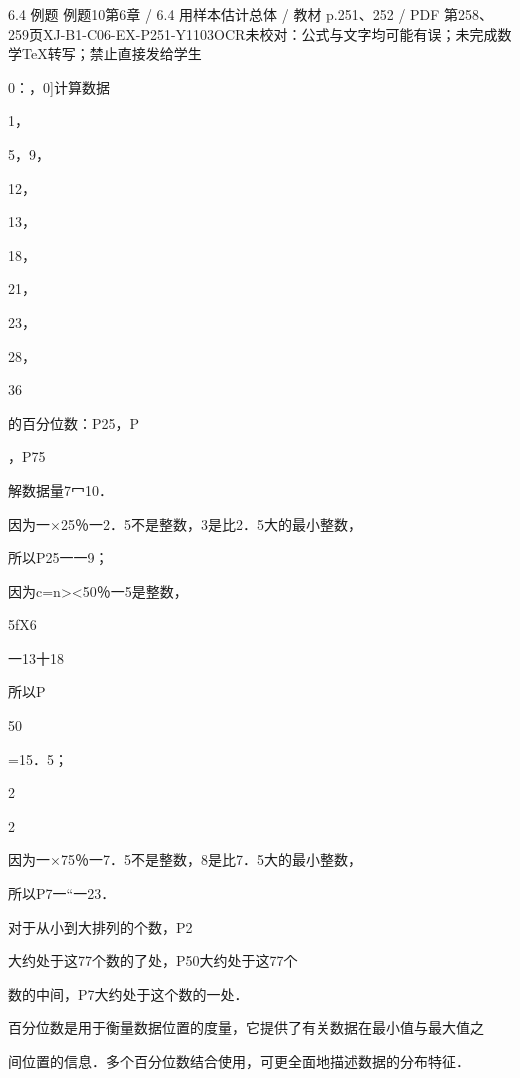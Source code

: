 \begin{bankitem}{6.4 例题 例题10}{第6章 / 6.4 用样本估计总体 / 教材 p.251、252 / PDF 第258、259页}{XJ-B1-C06-EX-P251-Y1103}{OCR未校对：公式与文字均可能有误；未完成数学TeX转写；禁止直接发给学生}
\begin{ocrdraft}
\par
0：，0]计算数据
\par
1，
\par
5，9，
\par
12，
\par
13，
\par
18，
\par
21，
\par
23，
\par
28，
\par
36
\par
的百分位数：P25，P
\par
，P75
\par
解数据量7冖10．
\par
因为一\ensuremath{\times}25％一2．5不是整数，3是比2．5大的最小整数，
\par
所以P25一一9；
\par
因为c=n><50％一5是整数，
\par
5fX6
\par
一13十18
\par
所以P
\par
50
\par
=15．5；
\par
2
\par
2
\par
因为一\ensuremath{\times}75％一7．5不是整数，8是比7．5大的最小整数，
\par
所以P7一“一23．
\par
对于从小到大排列的个数，P2
\par
大约处于这77个数的了处，P50大约处于这77个
\par
[教材p.252 / PDF第259页]
\par
数的中间，P7大约处于这个数的一处．
\par
百分位数是用于衡量数据位置的度量，它提供了有关数据在最小值与最大值之
\par
间位置的信息．多个百分位数结合使用，可更全面地描述数据的分布特征．
\end{ocrdraft}
\end{bankitem}
